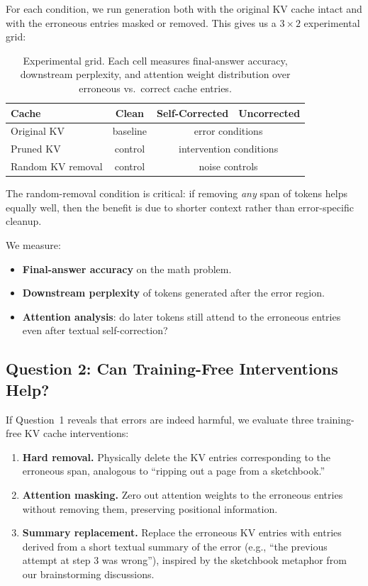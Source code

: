 \documentclass[11pt,a4paper]{article}
\begin{document}
For each condition, we run generation both with the original KV cache intact and with the erroneous entries masked or removed. This gives us a $3 \times 2$ experimental grid:

\begin{table}[h]
\centering
\small
\begin{tabular}{@{}l c c c@{}}
\toprule
\textbf{Cache} & \textbf{Clean} & \textbf{Self-Corrected} & \textbf{Uncorrected} \\
\midrule
Original KV & baseline & \multicolumn{2}{c}{error conditions} \\
Pruned KV & control & \multicolumn{2}{c}{intervention conditions} \\
Random KV removal & control & \multicolumn{2}{c}{noise controls} \\
\bottomrule
\end{tabular}
\caption{Experimental grid. Each cell measures final-answer accuracy, downstream perplexity, and attention weight distribution over erroneous vs.\ correct cache entries.}
\label{tab:grid}
\end{table}

The random-removal condition is critical: if removing \emph{any} span of tokens helps equally well, then the benefit is due to shorter context rather than error-specific cleanup.

We measure:
\begin{itemize}
    \item \textbf{Final-answer accuracy} on the math problem.
    \item \textbf{Downstream perplexity} of tokens generated after the error region.
    \item \textbf{Attention analysis}: do later tokens still attend to the erroneous entries even after textual self-correction?
\end{itemize}

\subsection{Question 2: Can Training-Free Interventions Help?}

If Question~1 reveals that errors are indeed harmful, we evaluate three training-free KV cache interventions:
\begin{enumerate}
    \item \textbf{Hard removal.} Physically delete the KV entries corresponding to the erroneous span, analogous to ``ripping out a page from a sketchbook.''
    \item \textbf{Attention masking.} Zero out attention weights to the erroneous entries without removing them, preserving positional information.
    \item \textbf{Summary replacement.} Replace the erroneous KV entries with entries derived from a short textual summary of the error (e.g., ``the previous attempt at step 3 was wrong''), inspired by the sketchbook metaphor from our brainstorming discussions.
\end{enumerate}
\end{document}
